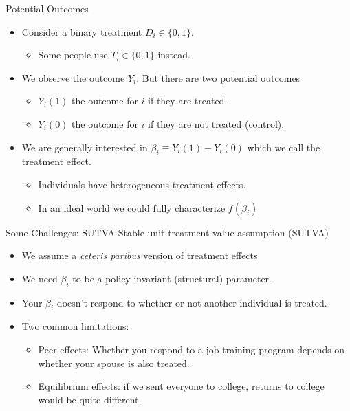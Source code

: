 \documentclass[aspectratio=169,11pt]{beamer}
\begin{document}
\begin{frame}{Potential Outcomes}
\begin{itemize}
\item Consider a binary treatment $D_i \in \{0,1\}$. 
\begin{itemize}
\item Some people use $T_i \in \{0,1\}$ instead.
\end{itemize}
\item We observe the outcome $Y_i$. But there are two \alert{potential outcomes}
\begin{itemize}
\item $Y_i(1)$ the outcome for $i$ if they  \alert{are treated}.
\item $Y_i(0)$ the outcome for $i$ if they \alert{are not treated} (control).
\end{itemize}
\item We are generally interested in $\beta_i \equiv  Y_i(1)-Y_i(0)$ which we call the \alert{treatment effect}.
\begin{itemize}
\item Individuals have \alert{heterogeneous treatment effects}.
\item In an ideal world we could fully characterize $f(\beta_i)$
\end{itemize}
\end{itemize}
\end{frame}

\begin{frame}{Some Challenges: SUTVA}
Stable unit treatment value assumption (SUTVA)
\begin{itemize}
\item We assume a \textit{ceteris paribus} version of treatment effects
\item We need $\beta_i$ to be a policy invariant (structural) parameter.
\item Your $\beta_i$ doesn't respond to whether or not another individual is treated.
\item Two common limitations:
\begin{itemize}
\item Peer effects: Whether you respond to a job training program depends on whether your spouse is also treated.
\item Equilibrium effects: if we sent everyone to college, returns to college would be quite different.
\end{itemize}
\end{itemize}
\end{frame}
\end{document}
